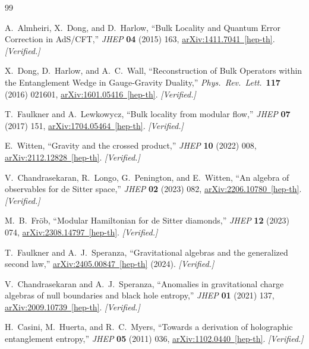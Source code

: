 \documentclass[11pt,a4paper]{article}
\theoremstyle{remark}
\begin{document}
\begin{thebibliography}{99}

A.~Almheiri, X.~Dong, and D.~Harlow,
``Bulk Locality and Quantum Error Correction in AdS/CFT,''
\emph{JHEP} \textbf{04} (2015) 163,
\href{https://arxiv.org/abs/1411.7041}{arXiv:1411.7041~[hep-th]}.
\textit{[Verified.]}

X.~Dong, D.~Harlow, and A.~C.~Wall,
``Reconstruction of Bulk Operators within the Entanglement Wedge
in Gauge-Gravity Duality,''
\emph{Phys.\ Rev.\ Lett.}\ \textbf{117} (2016) 021601,
\href{https://arxiv.org/abs/1601.05416}{arXiv:1601.05416~[hep-th]}.
\textit{[Verified.]}

T.~Faulkner and A.~Lewkowycz,
``Bulk locality from modular flow,''
\emph{JHEP} \textbf{07} (2017) 151,
\href{https://arxiv.org/abs/1704.05464}{arXiv:1704.05464~[hep-th]}.
\textit{[Verified.]}

E.~Witten,
``Gravity and the crossed product,''
\emph{JHEP} \textbf{10} (2022) 008,
\href{https://arxiv.org/abs/2112.12828}{arXiv:2112.12828~[hep-th]}.
\textit{[Verified.]}

V.~Chandrasekaran, R.~Longo, G.~Penington, and E.~Witten,
``An algebra of observables for de Sitter space,''
\emph{JHEP} \textbf{02} (2023) 082,
\href{https://arxiv.org/abs/2206.10780}{arXiv:2206.10780~[hep-th]}.
\textit{[Verified.]}

M.~B.~Fr\"ob,
``Modular Hamiltonian for de Sitter diamonds,''
\emph{JHEP} \textbf{12} (2023) 074,
\href{https://arxiv.org/abs/2308.14797}{arXiv:2308.14797~[hep-th]}.
\textit{[Verified.]}

T.~Faulkner and A.~J.~Speranza,
``Gravitational algebras and the generalized second law,''
\href{https://arxiv.org/abs/2405.00847}{arXiv:2405.00847~[hep-th]} (2024).
\textit{[Verified.]}

V.~Chandrasekaran and A.~J.~Speranza,
``Anomalies in gravitational charge algebras of null boundaries and
black hole entropy,''
\emph{JHEP} \textbf{01} (2021) 137,
\href{https://arxiv.org/abs/2009.10739}{arXiv:2009.10739~[hep-th]}.
\textit{[Verified.]}

H.~Casini, M.~Huerta, and R.~C.~Myers,
``Towards a derivation of holographic entanglement entropy,''
\emph{JHEP} \textbf{05} (2011) 036,
\href{https://arxiv.org/abs/1102.0440}{arXiv:1102.0440~[hep-th]}.
\textit{[Verified.]}


\end{thebibliography}
\end{document}
